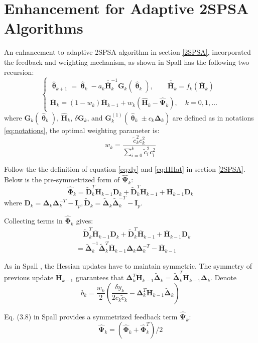 \documentclass[conference]{IEEEtran}
\newcommand{\bD}{\bm{D}}
\newcommand{\bG}{\bm{G}}
\newcommand{\bI}{\bm{I}}
\newcommand{\bDelta}{\bm{\Delta}}
\newcommand{\oH}{\bm{\overline{H}}}
\newcommand{\ooH}{\bm{\overline{\overline{H}}}}
\newcommand{\hH}{\bm{\hat{H}}}
\newcommand{\hPsi}{\bm{\hat{\Psi}}}
\newcommand{\htheta}{\bm{\hat{\uptheta}}}
\newcommand{\hPhi}{\bm{\hat{\Phi}}}
\newcommand{\tDelta}{\bm{\tilde{\Delta}}}
\newcommand{\tD}{\bm{\tilde{D}}}
\begin{document}
\section{Enhancement for Adaptive 2SPSA Algorithms} \label{Enhanced 2SPSA}
An enhancement to adaptive 2SPSA algorithm in section \ref{2SPSA}, incorporated the feedback and weighting mechanism, as shown in Spall \cite{Spall2009} has the following two recursion:
\begin{equation} \label{eq:Enhancement}
\begin{cases}
	\htheta_{k+1}=\htheta_k-a_k\ooH_k^{-1} \bG_k(\htheta_k),\qquad \bm{\ooH}_k=f_k(\oH_k)\\
	\oH_k=(1-w_k)\oH_{k-1}+w_k(\hH_k-\hPsi_k), \quad k=0,1,\dots
\end{cases}
\end{equation}
where $\bG_k(\htheta_k)$, $\hH_k$, $\delta\bG_k$, and $\bG_k^{(1)}(\htheta_k\pm c_k\bDelta_k)$ are defined as in notations \ref{eq:notations}, the optimal weighting parameter is:
\begin{equation} \label{eq:weighting}
w_k=\frac{\tilde{c}_k^2c_k^2}{\sum_{i=0}^{k}\tilde{c}_i^2c_i^2}
\end{equation}

Follow the the definition of equation \ref{eq:dy} and \ref{eq:HHat} in section \ref{2SPSA}. Below is the pre-symmetrized form of $ \hPsi_k $:
\begin{equation}
	\hPhi_k=\tD_k^T\oH_{k-1}\bD_k+\tD_k^T\oH_{k-1}+\oH_{k-1}\bD_k
\end{equation}
where $ \bD_k=\bDelta_k\bDelta_k^{-T}-\bI_p, \tD_k=\tDelta_k\tDelta_k^{-T}-\bI_p $.

Collecting terms in $\hPhi_k$ gives:
\begin{align*}
&\quad\tD_k^T\oH_{k-1}\bD_k+\tD_k^T\oH_{k-1}+\oH_{k-1}\bD_k\\
&=\tDelta_k^{-1}\tDelta_k^{T}\oH_{k-1}\bDelta_k\bDelta_k^{-T}-\oH_{k-1}
\end{align*}

As in Spall \cite{Spall2009}, the Hessian updates have to maintain symmetric. The symmetry of previous update $ \oH_{k-1}$ guarantees that $\bDelta_k^{T}\oH_{k-1}\tDelta_k=\tDelta_k^{T}\oH_{k-1}\bDelta_k$. Denote
\begin{equation}
b_k=\frac{w_k}{2}(\frac{\delta y_k}{2c_k\tilde{c}_k}-\bDelta_k^{T}\oH_{k-1}\tDelta_k)
\end{equation}

Eq. (3.8) in Spall \cite{Spall2009} provides a symmetrized feedback term $ \hPsi_k $:
\begin{equation} \label{eq:PsiHat}
\hPsi_k =(\hPhi_k+\hPhi_k^T)/2
\end{equation}
\end{document}
